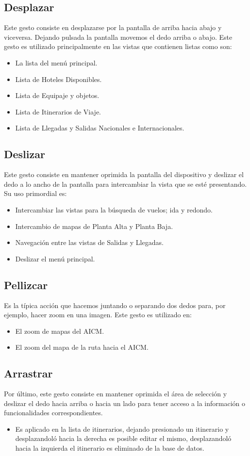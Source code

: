 \subsection{Desplazar}
Este gesto consiste en desplazarse por la pantalla de arriba hacia abajo y viceversa. 
Dejando pulsada la pantalla movemos el dedo arriba o abajo. Este gesto es utilizado principalmente en las vistas que contienen 
listas como son:

\begin{itemize}
 \item La lista del menú principal.
 \item Lista de Hoteles Disponibles.
 \item Lista de Equipaje y objetos.
 \item Lista de Itinerarios de Viaje.
 \item Lista de Llegadas y Salidas Nacionales e Internacionales.
\end{itemize}

\subsection{Deslizar}
Este gesto consiste en mantener oprimida la pantalla del dispositivo y deslizar el dedo a lo ancho de la pantalla para intercambiar 
la vista que se esté presentando. Su uso primordial es:

\begin{itemize}
 \item Intercambiar las vistas para la búsqueda de vuelos; ida y redondo.
 \item Intercambio de mapas de Planta Alta y Planta Baja.
 \item Navegación entre las vistas de Salidas y Llegadas.
 \item Deslizar el menú principal.
\end{itemize}

\subsection{Pellizcar}
Es la típica acción que hacemos juntando o separando dos dedos para, por ejemplo, hacer zoom en una imagen. Este gesto es utilizado en:
\begin{itemize}
 \item El zoom de mapas del AICM.
 \item El zoom del mapa de la ruta hacia el AICM.
\end{itemize}

\subsection{Arrastrar}
Por último, este gesto consiste en mantener oprimida el área de selección y deslizar el dedo hacia arriba o hacia un lado para tener 
acceso a la información o funcionalidades correspondientes. 
\begin{itemize}
 \item Es aplicado en la lista de itinerarios, dejando presionado un itinerario y desplazandoló hacia la derecha es posible editar el mismo, 
 desplazandoló hacia la izquierda el itinerario es eliminado de la base de datos.
\end{itemize}
